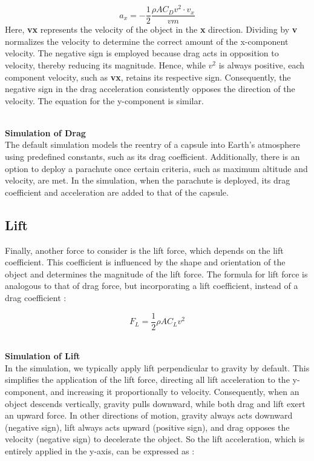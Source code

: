 \documentclass[runningheads]{llncs}
\begin{document}
\begin{equation}
a_x = - \frac{1}{2} \frac{\rho A C_D v^2 \cdot v_x}{v m}
\end{equation}
Here, \textbf{vx} represents the velocity of the object in the \textbf{x} direction. Dividing by \textbf{v} normalizes the velocity to determine the correct amount of the x-component velocity. The negative sign is employed because drag acts in opposition to velocity, thereby reducing its magnitude. Hence, while \( v^2 \) is always positive, each component velocity, such as \textbf{vx}, retains its respective sign. Consequently, the negative sign in the drag acceleration consistently opposes the direction of the velocity. The equation for the 
y-component is similar.

\textbf{\\Simulation of Drag\\}
The default simulation models the reentry of a capsule into Earth's atmosphere using predefined constants, such as its drag coefficient. Additionally, there is an option to deploy a parachute once certain criteria, such as maximum altitude and velocity, are met. In the simulation, when the parachute is deployed, its drag coefficient and acceleration are added to that of the capsule.




\subsection{Lift}
Finally, another force to consider is the lift force, which depends on the lift coefficient. This coefficient is influenced by the shape and orientation of the object and determines the magnitude of the lift force. The formula for lift force is analogous to that of drag force, but incorporating a lift coefficient, instead of a drag coefficient \cite{orlando_voxels}:

\begin{equation}
F_L = \frac{1}{2} \rho A C_L v^2
\end{equation}

\textbf{\\Simulation of Lift\\}
In the simulation, we typically apply lift perpendicular to gravity by default. This simplifies the application of the lift force, directing all lift acceleration to the y-component, and increasing it proportionally to velocity. Consequently, when an object descends vertically, gravity pulls downward, while both drag and lift exert an upward force. In other directions of motion, gravity always acts downward (negative sign), lift always acts upward (positive sign), and drag opposes the velocity (negative sign) to decelerate the object. So the lift acceleration, which is entirely applied in the y-axis, can be expressed as \cite{miguel_optimal_reentry_control}:
\end{document}
